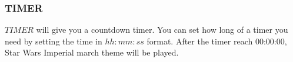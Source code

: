 \begin{minipage}{0.97\textwidth}
 \noindent{}\hfill
\noindent{}\hfill
{}
\end{minipage}


\subsubsection{TIMER}

$TIMER$ will give you a countdown timer. You can set how long of a timer you need by setting the time in $hh:mm:ss$ format. After the timer reach 00:00:00, Star Wars Imperial march theme will be played.

